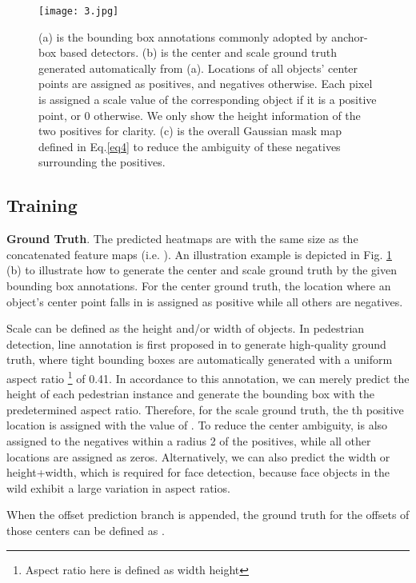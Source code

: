 \documentclass[review]{elsarticle}
\begin{document}
\begin{figure}[t]
\begin{center}
\texttt{[image: 3.jpg]}
\end{center}
   \caption{(a) is the bounding box annotations commonly adopted by anchor-box based detectors. (b) is the center and scale ground truth generated automatically from (a). Locations of all objects' center points are assigned as positives, and negatives otherwise. Each pixel is assigned a scale value of the corresponding object if it is a positive point, or 0 otherwise. We only show the height information of the two positives for clarity. (c) is the overall Gaussian mask map  defined in Eq.\ref{eq4} to reduce the ambiguity of these negatives surrounding the positives.}
\label{fig:gt}
\end{figure}
\subsection{Training}
\textbf{Ground Truth}.
The predicted heatmaps are with the same size as the concatenated feature maps (i.e.  ). An illustration example is depicted in Fig. \ref{fig:gt} (b) to illustrate how to generate the center and scale ground truth by the given bounding box annotations. For the center ground truth, the location where an object's center point falls in is assigned as positive while all others are negatives.

Scale can be defined as the height and/or width of objects.
In pedestrian detection, line annotation is first proposed in \cite{zhang2018towards,zhang2017citypersons} to generate high-quality ground truth, where tight bounding boxes are automatically generated with a uniform aspect ratio \footnote{Aspect ratio here is defined as width  height} of 0.41. In accordance to this annotation, we can merely predict the height of each pedestrian instance and generate the bounding box with the predetermined aspect ratio. Therefore, for the scale ground truth, the th positive location is assigned with the value of . To reduce the center ambiguity,  is also assigned to the negatives within a radius 2 of the positives, while all other locations are assigned as zeros.
Alternatively, we can also predict the width or height+width, which is required for face detection, because face objects in the wild exhibit a large variation in aspect ratios.

When the offset prediction branch is appended, the ground truth for the offsets of those centers can be defined as .
\end{document}
